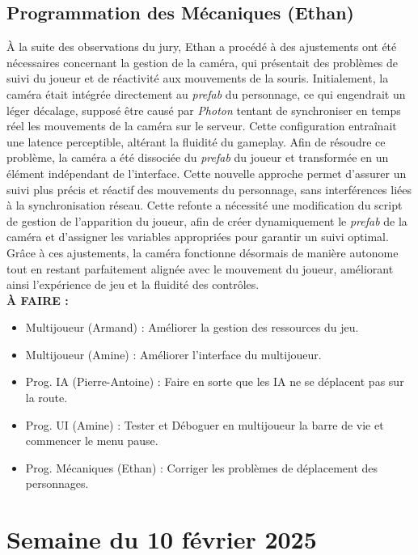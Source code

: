 \documentclass{report}
\begin{document}
\subsection*{Programmation des Mécaniques (Ethan)}
À la suite des observations du jury, Ethan a procédé à des ajustements ont été nécessaires concernant la gestion de la caméra, qui présentait des problèmes de suivi du joueur et de réactivité aux mouvements de la souris. Initialement, la caméra était intégrée directement au \textit{prefab} du personnage, ce qui engendrait un léger décalage, supposé être causé par \textit{Photon} tentant de synchroniser en temps réel les mouvements de la caméra sur le serveur. Cette configuration entraînait une latence perceptible, altérant la fluidité du gameplay. Afin de résoudre ce problème, la caméra a été dissociée du \textit{prefab} du joueur et transformée en un élément indépendant de l’interface. Cette nouvelle approche permet d’assurer un suivi plus précis et réactif des mouvements du personnage, sans interférences liées à la synchronisation réseau. Cette refonte a nécessité une modification du script de gestion de l’apparition du joueur, afin de créer dynamiquement le \textit{prefab} de la caméra et d’assigner les variables appropriées pour garantir un suivi optimal. Grâce à ces ajustements, la caméra fonctionne désormais de manière autonome tout en restant parfaitement alignée avec le mouvement du joueur, améliorant ainsi l’expérience de jeu et la fluidité des contrôles.
\\[1cm]
\textbf{À FAIRE :}
\begin{itemize}
    \item Multijoueur (Armand) : Améliorer la gestion des ressources du jeu.
    \item Multijoueur (Amine) : Améliorer l'interface du multijoueur.
    \item Prog. IA (Pierre-Antoine) : Faire en sorte que les IA ne se déplacent pas sur la route.
    \item Prog. UI (Amine) : Tester et Déboguer en multijoueur la barre de vie et commencer le menu pause.
    \item Prog. Mécaniques (Ethan) : Corriger les problèmes de déplacement des personnages.
\end{itemize}







\newpage
\section{Semaine du 10 février 2025}
\end{document}
